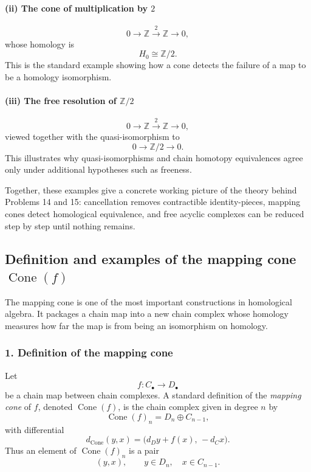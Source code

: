 \documentclass[12pt,a4paper]{article}
\theoremstyle{notespace}
\begin{document}
\paragraph{(ii) The cone of multiplication by \(2\)}
\[
0\to \mathbb Z \xrightarrow{2} \mathbb Z \to 0,
\]
whose homology is
\[
H_0\cong \mathbb Z/2.
\]
This is the standard example showing how a cone detects the failure of a map to be a homology isomorphism.

\paragraph{(iii) The free resolution of \(\mathbb Z/2\)}
\[
0\to \mathbb Z \xrightarrow{2} \mathbb Z \to 0,
\]
viewed together with the quasi-isomorphism to
\[
0\to \mathbb Z/2 \to 0.
\]
This illustrates why quasi-isomorphisms and chain homotopy equivalences agree only under additional hypotheses such as freeness.

\medskip

Together, these examples give a concrete working picture of the theory behind Problems 14 and 15: cancellation removes contractible identity-pieces, mapping cones detect homological equivalence, and free acyclic complexes can be reduced step by step until nothing remains.

\subsection{Definition and examples of the mapping cone \texorpdfstring{\(\operatorname{Cone}(f)\)}{Cone(f)}}

The mapping cone is one of the most important constructions in homological algebra. It packages a chain map into a new chain complex whose homology measures how far the map is from being an isomorphism on homology.

\subsubsection*{1. Definition of the mapping cone}

Let
\[
f:C_\bullet \to D_\bullet
\]
be a chain map between chain complexes. A standard definition of the \emph{mapping cone} of \(f\), denoted \(\operatorname{Cone}(f)\), is the chain complex given in degree \(n\) by
\[
\operatorname{Cone}(f)_n=D_n\oplus C_{n-1},
\]
with differential
\[
d_{\operatorname{Cone}}(y,x)=\bigl(d_D y+f(x),\,-d_C x\bigr).
\]
Thus an element of \(\operatorname{Cone}(f)_n\) is a pair
\[
(y,x),\qquad y\in D_n,\quad x\in C_{n-1}.
\]
\end{document}
